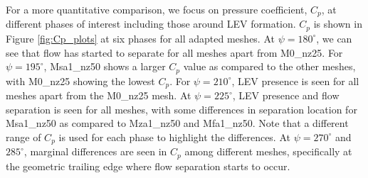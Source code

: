 For a more quantitative comparison, we focus on pressure coefficient, $C_p$,  at different phases of interest including those around LEV formation. $C_p$ is shown in Figure \ref{fig:Cp_plots} at six phases for all adapted meshes. At $\psi=180^\circ$, we can see that flow has started to separate for all meshes apart from M0\_nz25. For $\psi=195^\circ$, Msa1\_nz50 shows a larger $C_p$ value as compared to the other meshes, with M0\_nz25 showing the lowest $C_p$. For $\psi=210^\circ$, LEV presence is seen for all meshes apart from the M0\_nz25 mesh. At $\psi=225^\circ$, LEV presence and flow separation is seen for all meshes, with some differences in separation location for Msa1\_nz50 as compared to Mza1\_nz50 and Mfa1\_nz50. Note that a different range of $C_p$ is used for each phase to highlight the differences. At
$\psi=270^\circ$ and $285^\circ$, marginal differences are seen in $C_p$ among different meshes, specifically at the geometric trailing edge where flow separation starts to occur. 


